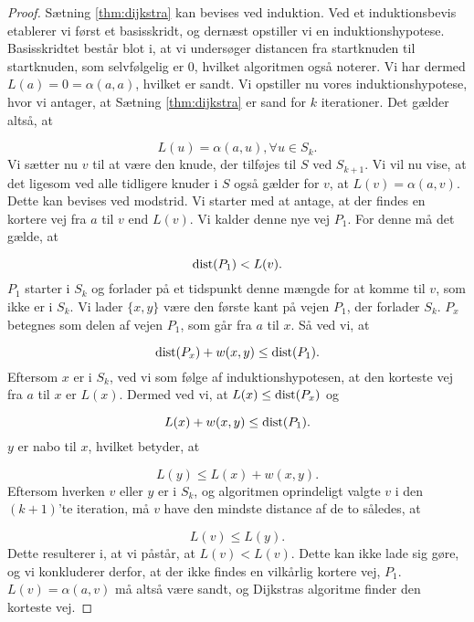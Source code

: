 \begin{proof}
Sætning \ref{thm:dijkstra} kan bevises ved induktion. Ved et induktionsbevis etablerer vi først et basisskridt, og dernæst opstiller vi en induktionshypotese. Basisskridtet består blot i, at vi undersøger distancen fra startknuden til startknuden, som selvfølgelig er 0, hvilket algoritmen også noterer. Vi har dermed $L(a)=0= \alpha(a,a)$, hvilket er sandt.
Vi opstiller nu vores induktionshypotese, hvor vi antager, at Sætning \ref{thm:dijkstra} er sand for $k$ iterationer. Det gælder altså, at

\begin{equation}
L(u) = \alpha(a,u), \forall u \in S_k. 
\end{equation} %
Vi sætter nu $v$ til at være den knude, der tilføjes til $S$ ved $S_{k+1}$. Vi vil nu vise, at det ligesom ved alle tidligere knuder i $S$ også gælder for $v$, at $L(v)=\alpha(a,v)$. Dette kan bevises ved modstrid. Vi starter med at antage, at der findes en kortere vej fra $a$ til $v$ end $L(v)$. Vi kalder denne nye vej $P_1$. For denne må det gælde, at

\begin{equation}
\textrm{dist}(P_1)<L(v).
\end{equation} %
$P_1$ starter i $S_k$ og forlader på et tidspunkt denne mængde for at komme til $v$, som ikke er i $S_k$. Vi lader $\{x,y\}$ være den første kant på vejen $P_1$, der forlader $S_k$. $P_x$ betegnes som delen af vejen $P_1$, som går fra $a$ til $x$. Så ved vi, at

\begin{equation}
\textrm{dist}(P_x)+w(x,y) \leq \textrm{dist}(P_1).
\end{equation}
Eftersom $x$ er i $S_k$, ved vi som følge af induktionshypotesen, at den korteste vej fra $a$ til $x$ er $L(x)$. Dermed ved vi, at $L(x) \leq \textrm{dist}(P_x)$ og

\begin{equation}
L(x) + w(x,y) \leq \textrm{dist}(P_1).
\end{equation}
$y$ er nabo til $x$, hvilket betyder, at

\begin{equation}
L(y) \leq L(x) + w(x,y).
\end{equation}
Eftersom hverken $v$ eller $y$ er i $S_k$, og algoritmen oprindeligt valgte $v$ i den $(k+1)$'te iteration, må $v$ have den mindste distance af de to således, at

\begin{equation}
L(v) \leq L(y).
\end{equation}
Dette resulterer i, at vi påstår, at $L(v) < L(v)$. Dette kan ikke lade sig gøre, og vi konkluderer derfor, at der ikke findes en vilkårlig kortere vej, $P_1$. $L(v)=\alpha(a,v)$ må altså være sandt, og Dijkstras algoritme finder den korteste vej.
\end{proof}

